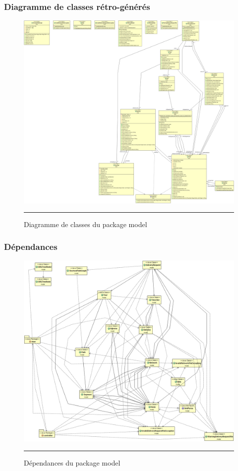 \subsubsection{Diagramme de classes rétro-générés}
\begin{figure}[H]
	\centering
		\includegraphics[width=\textwidth,height=\textheight,keepaspectratio]{Figures/retro_model}
		\rule{35em}{0.5pt}
	\caption[Diagramme de classes du package model]{Diagramme de classes du package model}
\end{figure}
\subsubsection{Dépendances}
\begin{figure}[H]
	\centering
		\includegraphics[width=\textwidth,height=\textheight,keepaspectratio]{Figures/retro_model_dep}
		\rule{35em}{0.5pt}
	\caption[Dépendances du package model]{Dépendances du package model}
\end{figure}
